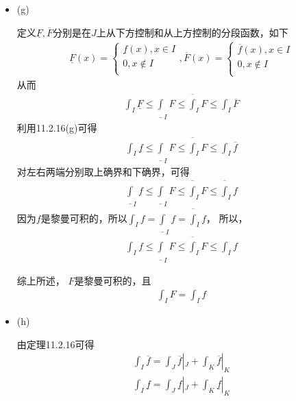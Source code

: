 \documentclass{article}
\begin{document}
\begin{itemize}
  \item (g)

        定义$\underline{F}, \overline{F}$分别是在$J$上从下方控制和从上方控制的分段函数，如下
        \begin{align*}
          \underline{F} (x) =
          \begin{cases*}
            \underline{f}(x),  x \in I    \\
            0,                 x \notin I \\
          \end{cases*}
          ,\overline{F}(x) =
          \begin{cases*}
            \overline{f}(x),  x \in I     \\
            0,                 x \notin I \\
          \end{cases*}
        \end{align*}
        从而
        \begin{align*}
          \int_I \underline{F} \leq \underline{\int}_I F \leq \overline{\int}_I F \leq \int_I \overline{F}
        \end{align*}
        利用11.2.16(g)可得
        \begin{align*}
          \int_I \underline{f} \leq \underline{\int}_I F \leq \overline{\int}_I F \leq \int_I \overline{f}
        \end{align*}
        对左右两端分别取上确界和下确界，可得
        \begin{align*}
          \underline{\int}_I f \leq \underline{\int}_I F \leq \overline{\int}_I F \leq \overline{\int}_I f
        \end{align*}
        因为$f$是黎曼可积的，所以$\int_I f = \underline{\int}_I f = \overline{\int}_I f$，
        所以，
        \begin{align*}
          \int_I f \leq \underline{\int}_I F \leq \overline{\int}_I F \leq \int_I f
        \end{align*}

        综上所述，
        $F$是黎曼可积的，且
        \begin{align*}
          \int_I F = \int_I f
        \end{align*}

  \item (h)

        由定理11.2.16可得
        \begin{align*}
          \int_I \overline{f} = \int_J \overline{f}|_J + \int_K \overline{f}|_K    \\
          \int_I \underline{f} = \int_J \underline{f}|_J + \int_K \underline{f}|_K \\
        \end{align*}


\end{itemize}
\end{document}
